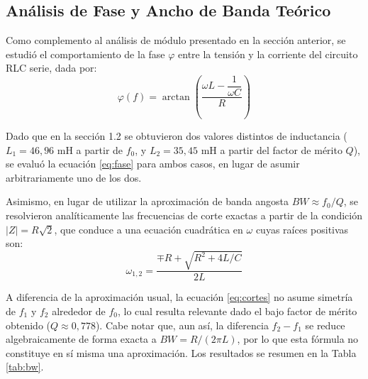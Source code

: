 


\subsection{Análisis de Fase y Ancho de Banda Teórico}

Como complemento al análisis de módulo presentado en la sección anterior, se estudió el comportamiento de la fase $\varphi$ entre la tensión y la corriente del circuito RLC serie, dada por:
\begin{equation}
\varphi(f) = \arctan\left(\frac{\omega L - \dfrac{1}{\omega C}}{R}\right)
\label{eq:fase}
\end{equation}

Dado que en la sección 1.2 se obtuvieron dos valores distintos de inductancia ($L_1 = 46{,}96$ mH a partir de $f_0$, y $L_2 = 35{,}45$ mH a partir del factor de mérito $Q$), se evaluó la ecuación \eqref{eq:fase} para ambos casos, en lugar de asumir arbitrariamente uno de los dos.

Asimismo, en lugar de utilizar la aproximación de banda angosta $BW \approx f_0/Q$, se resolvieron analíticamente las frecuencias de corte exactas a partir de la condición $|Z| = R\sqrt{2}$, que conduce a una ecuación cuadrática en $\omega$ cuyas raíces positivas son:
\begin{equation}
\omega_{1,2} = \frac{\mp R + \sqrt{R^2 + 4L/C}}{2L}
\label{eq:cortes}
\end{equation}

A diferencia de la aproximación usual, la ecuación \eqref{eq:cortes} no asume simetría de $f_1$ y $f_2$ alrededor de $f_0$, lo cual resulta relevante dado el bajo factor de mérito obtenido ($Q \approx 0{,}778$). Cabe notar que, aun así, la diferencia $f_2-f_1$ se reduce algebraicamente de forma exacta a $BW = R/(2\pi L)$, por lo que esta fórmula no constituye en sí misma una aproximación. Los resultados se resumen en la Tabla \ref{tab:bw}.


